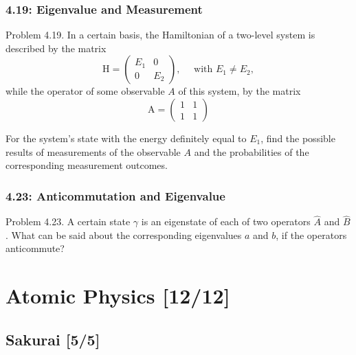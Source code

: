 \documentclass[11pt]{article}
\begin{document}
\subsubsection{4.19: Eigenvalue and Measurement}
\label{sec:orga032471}
Problem 4.19. In a certain basis, the Hamiltonian of a two-level system is
described by the matrix $$ \mathrm{H}=\left(\begin{array}{cc} E_1 & 0 \\ 0 & E_2
\end{array}\right), \quad \text { with } E_1 \neq E_2, $$ while the operator of
some observable \(A\) of this system, by the matrix $$
\mathrm{A}=\left(\begin{array}{ll} 1 & 1 \\ 1 & 1 \end{array}\right) $$

For the system's state with the energy definitely equal to \(E_1\), find the
possible results of measurements of the observable \(A\) and the probabilities of
the corresponding measurement outcomes.
\subsubsection{4.23: Anticommutation and Eigenvalue}
\label{sec:orgccc6387}
Problem 4.23. A certain state \(\gamma\) is an eigenstate of each of two operators
\(\hat{A}\) and \(\hat{B}\). What can be said about the corresponding eigenvalues
\(a\) and \(b\), if the operators anticommute?
\section{Atomic Physics [12/12]}
\label{sec:org3d7c97c}
\subsection{Sakurai [5/5]}
\label{sec:org17fe737}
\end{document}
